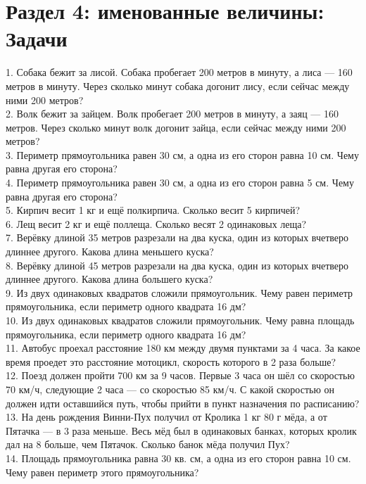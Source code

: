\documentclass[12pt]{article}
\begin{document}
\section{Раздел 4: именованные величины: Задачи}
1. Собака бежит за лисой. Собака пробегает 200 метров в минуту, а лиса --- 160 метров в минуту. Через сколько минут собака догонит лису, если сейчас между ними 200 метров?\\
2. Волк бежит за зайцем. Волк пробегает 200 метров в минуту, а заяц --- 160 метров. Через сколько минут волк догонит зайца, если сейчас между ними 200 метров?\\
3. Периметр прямоугольника равен 30 см, а одна из его сторон равна 10 см. Чему равна другая его сторона?\\
4. Периметр прямоугольника равен 30 см, а одна из его сторон равна 5 см. Чему равна другая его сторона?\\
5. Кирпич весит 1 кг и ещё полкирпича. Сколько весит 5 кирпичей?\\
6. Лещ весит 2 кг и ещё поллеща. Сколько весят 2 одинаковых леща?\\
7. Верёвку длиной 35 метров разрезали на два куска, один из которых вчетверо длиннее другого. Какова длина меньшего куска?\\
8. Верёвку длиной 45 метров разрезали на два куска, один из которых вчетверо длиннее другого. Какова длина большего куска?\\
9. Из двух одинаковых квадратов сложили прямоугольник. Чему равен периметр прямоугольника, если периметр одного квадрата 16 дм?\\
10. Из двух одинаковых квадратов сложили прямоугольник. Чему равна площадь прямоугольника, если периметр одного квадрата 16 дм?\\
11. Автобус проехал расстояние 180 км между двумя пунктами за 4 часа. За какое время проедет это расстояние мотоцикл, скорость которого в 2 раза больше?\\
12. Поезд должен пройти 700 км за 9 часов. Первые 3 часа он шёл со скоростью 70 км/ч, следующие 2 часа --- со скоростью 85 км/ч. С какой скоростью он должен идти оставшийся путь, чтобы прийти в пункт назначения по расписанию?\\
13. На день рождения Винни-Пух получил от Кролика 1 кг 80 г мёда, а от Пятачка --- в 3 раза меньше. Весь мёд был в одинаковых банках, которых кролик дал на 8 больше, чем Пятачок. Сколько банок мёда получил Пух?\\
14. Площадь прямоугольника равна 30 кв. см, а одна из его сторон равна 10 см. Чему равен периметр этого прямоугольника?\\
\end{document}
